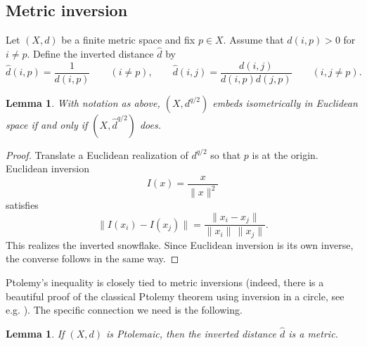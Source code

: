 \documentclass[12pt]{amsart}
\newtheorem{lemma}[theorem]{Lemma}
\theoremstyle{definition}
\newcommand{\1}{\mathbf{1}}
\begin{document}

\subsection{Metric inversion}

Let $(X,d)$ be a finite metric space and fix $p\in X$.  Assume that
$d(i,p)>0$ for $i\ne p$.  Define the inverted distance $\widehat d$ by
\[
        \widehat d(i,p)=\frac{1}{d(i,p)}\qquad (i\ne p),
        \qquad
        \widehat d(i,j)=\frac{d(i,j)}{d(i,p)d(j,p)}\qquad (i,j\ne p).
\]

\begin{lemma}
\label{lem:q5-inversion-euclidean}
With notation as above, $(X,d^{q/2})$ embeds isometrically in Euclidean space if
and only if $(X,\widehat d^{q/2})$ does.
\end{lemma}

\begin{proof}
Translate a Euclidean realization of $d^{q/2}$ so that $p$ is at the origin.
Euclidean inversion
\[
        I(x)=\frac{x}{\|x\|^2}
\]
satisfies
\[
        \|I(x_i)-I(x_j)\|=\frac{\|x_i-x_j\|}{\|x_i\|\,\|x_j\|}.
\]
This realizes the inverted snowflake.  Since Euclidean inversion is its own inverse,
the converse follows in the same way.
\end{proof}

Ptolemy's inequality is closely tied to metric inversions (indeed, there is a beautiful proof of the classical Ptolemy theorem using inversion in a circle, see e.g. \cite{BogomolnyPtolemyInversion}).
The specific connection we need is the following.

\begin{lemma}
\label{lem:q5-ptolemy-inversion}
If $(X,d)$ is Ptolemaic, then the inverted distance $\widehat d$ is a metric.
\end{lemma}
\end{document}

